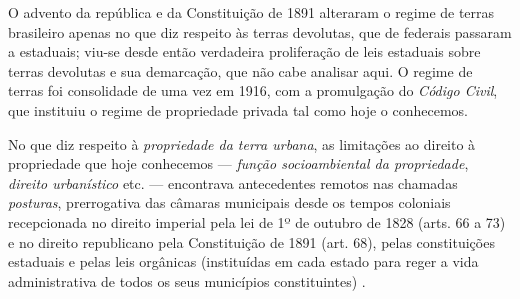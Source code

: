 O advento da república e da Constituição de 1891 alteraram o regime de terras brasileiro apenas no que diz respeito às terras devolutas, que de federais passaram a estaduais; viu-se desde então verdadeira proliferação de leis estaduais sobre terras devolutas e sua demarcação, que não cabe analisar aqui. O regime de terras foi consolidade de uma vez em 1916, com a promulgação do \textit{Código Civil}, que instituiu o regime de propriedade privada tal como hoje o conhecemos. 

No que diz respeito à \textit{propriedade da terra urbana}, as limitações ao direito à propriedade que hoje conhecemos --- \textit{função socioambiental da propriedade}, \textit{direito urbanístico} etc. --- encontrava antecedentes remotos nas chamadas \textit{posturas}, prerrogativa das câmaras municipais desde os tempos coloniais recepcionada no direito imperial pela lei de 1º de outubro de 1828 (arts. 66 a 73) e no direito republicano pela Constituição de 1891 (art. 68), pelas constituições estaduais e pelas leis orgânicas (instituídas em cada estado para reger a vida administrativa de todos os seus municípios constituintes) \cite{campanhole_const_1992}.
